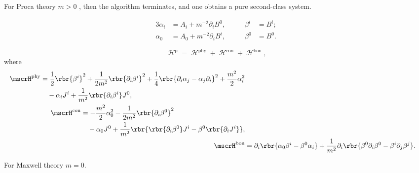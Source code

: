 \documentclass[a4paper,11pt]{article}
\begin{document}
For Proca theory $m > 0$ , then the algorithm terminates, and one obtains a 
pure second-class system.

\begin{alignat}{3}
\alpha_i &= A_i + m^{-2}\partial_i B^0,&\qquad \beta^i &= B^i; \\
\alpha_0 &= A_0 + m^{-2}\partial_i B^i,&\qquad \beta^0 &= B^0.
\end{alignat}

\begin{equation}
\mscrH^\text{p} = \mscrH^\text{phy}+\mscrH^\text{con}+\mscrH^\text{bon},
\end{equation}
where
\begin{align}
\begin{split}
\mscrH^\text{phy} &= \frac{1}{2}\rbr{\beta^i}^2 + 
\frac{1}{2m^2}\rbr{\partial_i \beta^i}^2 + \frac{1}{4}\rbr{\partial_i \alpha_j - 
\alpha_j \partial_i}^2 + \frac{m^2}{2}\alpha_i^2 \\
&\quad -\alpha_i J^i + \frac{1}{m^2}\rbr{\partial_i \beta^i}J^0,
\end{split}\\
\begin{split}
\mscrH^\text{con} &= -\frac{m^2}{2}\alpha_0^2 - \frac{1}{2m^2} 
\rbr{\partial_i \beta^0}^2 \\
&\quad -\alpha_0 J^0 + \frac{1}{m^2}\rbr{\rbr{\partial_i \beta^0} J^i - 
\beta^0\rbr{\partial_i J^i}},
\end{split}\\
\mscrH^\text{bon} &= \partial_i\rbr{\alpha_0\beta^i - \beta^0\alpha_i} + 
\frac{1}{m^2}\partial_i \rbr{\beta^0\partial_i \beta^0 - 
\beta^i\partial_j\beta^j}.
\end{align}




For Maxwell theory $m = 0$.











\end{document}
